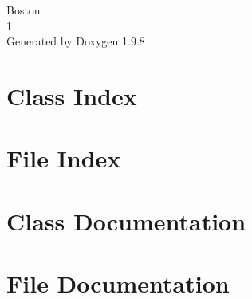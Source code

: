 \documentclass[twoside]{book}
\newcommand{\+}{\discretionary{\mbox{\scriptsize$\hookleftarrow$}}{}{}}
\newcommand{\clearemptydoublepage}{%
    \newpage{\pagestyle{empty}\cleardoublepage}%
  }
\begin{document}
  \raggedbottom
    \hypersetup{pageanchor=false,
                bookmarksnumbered=true,
                pdfencoding=unicode
               }
  \begin{titlepage}
  \vspace*{7cm}
  \begin{center}%
  {\Large Boston}\\
  [1ex]\large 1 \\
  \vspace*{1cm}
  {\large Generated by Doxygen 1.9.8}\\
  \end{center}
  \end{titlepage}
  \clearemptydoublepage
  \tableofcontents
  \clearemptydoublepage
  \hypersetup{pageanchor=true}
\chapter{Class Index}

\chapter{File Index}

\chapter{Class Documentation}



\chapter{File Documentation}


















  \backmatter
  \newpage
  \clearemptydoublepage
  \printindex
\end{document}

